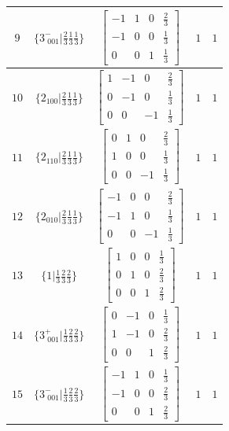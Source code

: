 \documentclass[fleqn,8pt]{jsarticle}
\begin{document}
\begin{longtable}{ccccc}
$ 9 $ & $ \{3^{-}_{\,\,001}|\frac{2}{3} \frac{1}{3} \frac{1}{3}\} $ & $ \begin{bmatrix} -1 & 1 & 0 & \frac{2}{3} \\ -1 & 0 & 0 & \frac{1}{3} \\ 0 & 0 & 1 & \frac{1}{3} \end{bmatrix} $ & $ 1 $ & $ 1 $ \\ \hline
$ 10 $ & $ \{2{}_{100}|\frac{2}{3} \frac{1}{3} \frac{1}{3}\} $ & $ \begin{bmatrix} 1 & -1 & 0 & \frac{2}{3} \\ 0 & -1 & 0 & \frac{1}{3} \\ 0 & 0 & -1 & \frac{1}{3} \end{bmatrix} $ & $ 1 $ & $ 1 $ \\ \hline
$ 11 $ & $ \{2{}_{110}|\frac{2}{3} \frac{1}{3} \frac{1}{3}\} $ & $ \begin{bmatrix} 0 & 1 & 0 & \frac{2}{3} \\ 1 & 0 & 0 & \frac{1}{3} \\ 0 & 0 & -1 & \frac{1}{3} \end{bmatrix} $ & $ 1 $ & $ 1 $ \\ \hline
$ 12 $ & $ \{2{}_{010}|\frac{2}{3} \frac{1}{3} \frac{1}{3}\} $ & $ \begin{bmatrix} -1 & 0 & 0 & \frac{2}{3} \\ -1 & 1 & 0 & \frac{1}{3} \\ 0 & 0 & -1 & \frac{1}{3} \end{bmatrix} $ & $ 1 $ & $ 1 $ \\ \hline
$ 13 $ & $ \{1|\frac{1}{3} \frac{2}{3} \frac{2}{3}\} $ & $ \begin{bmatrix} 1 & 0 & 0 & \frac{1}{3} \\ 0 & 1 & 0 & \frac{2}{3} \\ 0 & 0 & 1 & \frac{2}{3} \end{bmatrix} $ & $ 1 $ & $ 1 $ \\ \hline
$ 14 $ & $ \{3^{+}_{\,\,001}|\frac{1}{3} \frac{2}{3} \frac{2}{3}\} $ & $ \begin{bmatrix} 0 & -1 & 0 & \frac{1}{3} \\ 1 & -1 & 0 & \frac{2}{3} \\ 0 & 0 & 1 & \frac{2}{3} \end{bmatrix} $ & $ 1 $ & $ 1 $ \\ \hline
$ 15 $ & $ \{3^{-}_{\,\,001}|\frac{1}{3} \frac{2}{3} \frac{2}{3}\} $ & $ \begin{bmatrix} -1 & 1 & 0 & \frac{1}{3} \\ -1 & 0 & 0 & \frac{2}{3} \\ 0 & 0 & 1 & \frac{2}{3} \end{bmatrix} $ & $ 1 $ & $ 1 $ \\ \hline

\end{longtable}
\end{document}
